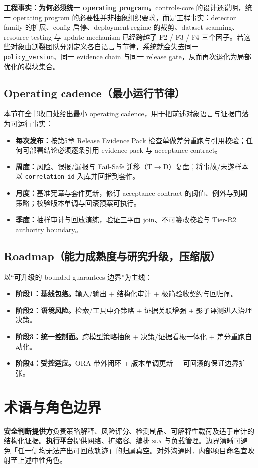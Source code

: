 \documentclass[11pt,a4paper]{report}
\begin{document}
\noindent\textbf{工程事实：为何必须统一 operating program。}controls-core 的设计还说明，统一 operating program 的必要性并非抽象组织要求，而是工程事实：detector family 的扩展、config 启停、deployment regime 的裁剪、dataset scanning、resource testing 与 update mechanism 已经跨越了 F2 / F3 / F4 三个因子。若这些对象由割裂团队分别定义各自语言与节律，系统就会失去同一 \texttt{policy\_version}、同一 evidence chain 与同一 release gate，从而再次退化为局部优化的模块集合。

\section{Operating cadence（最小运行节律）}
本节在全书收口处给出最小 operating cadence，用于把前述对象语言与证据门落为可运行事实：
\begin{itemize}
  \item \textbf{每次发布：}按第5章 Release Evidence Pack 检查单做差分重跑与引用校验；任何可部署结论必须逐条引用 evidence pack 与 acceptance contract。
  \item \textbf{周度：}风险、误报/漏报与 Fail-Safe 迁移（T$\rightarrow$D）复盘；将事故/未遂样本以 \texttt{correlation\_id} 入库并回指到套件。
  \item \textbf{月度：}基准宪章与套件更新，修订 acceptance contract 的阈值、例外与到期策略；校验版本单调与回滚预案可执行。
  \item \textbf{季度：}抽样审计与回放演练，验证三平面 join、不可篡改校验与 Tier-R2 authority boundary。
\end{itemize}

\section{Roadmap（能力成熟度与研究升级，压缩版）}
以“可升级的 bounded guarantees 边界”为主线：
\begin{itemize}
  \item \textbf{阶段1：基线包络。}输入/输出 \Guardrails{} + 结构化审计 + 极简验收契约与回归闸。
  \item \textbf{阶段2：语境风险。}检索/工具中介策略 + 证据关联增强 + 影子评测进入治理决策。
  \item \textbf{阶段3：统一控制面。}跨模型策略抽象 + 决策/证据看板一体化 + 差分重跑自动化。
  \item \textbf{阶段4：受控适应。}ORA 带外闭环 + 版本单调更新 + 可回滚的保证边界扩张。
\end{itemize}


\chapter{术语与角色边界}
\textbf{安全判断提供方}负责策略解释、风险评分、检测制品、可解释性载荷及适于审计的结构化证据。\textbf{执行平台}提供网络、扩缩容、编排 \textsc{sla} 与负载管理。边界清晰可避免「任一侧均无法产出可回放轨迹」的归属真空。对外沟通时，内部项目命名宜映射至上述中性角色。
\end{document}
